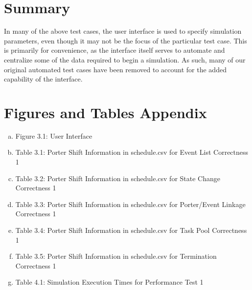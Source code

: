 \documentclass[paper=letter, fontsize=10pt]{scrartcl}
\numberwithin{equation}{section}		%
\numberwithin{figure}{section}			%
\numberwithin{table}{section}				%
\begin{document}
\section{Summary}
In many of the above test cases, the user interface is used to specify simulation parameters, even though it may not be the focus of the particular test case. This is primarily for convenience, as the interface itself serves to automate and centralize some of the data required to begin a simulation. As such, many of our original automated test cases have been removed to account for the added capability of the interface.
\section{Figures and Tables Appendix}
\begin{enumerate}[(a)]
	\item Figure 3.1: User Interface
	\item Table  3.1: Porter Shift Information in schedule.csv for Event List Correctness 1
	\item Table  3.2: Porter Shift Information in schedule.csv for State Change Correctness 1
	\item Table  3.3: Porter Shift Information in schedule.csv for Porter/Event Linkage Correctness 1
	\item Table  3.4: Porter Shift Information in schedule.csv for Task Pool Correctness 1
	\item Table  3.5: Porter Shift Information in schedule.csv for Termination Correctness 1
	\item Table  4.1: Simulation Execution Times for Performance Test 1
\end{enumerate}

\end{document}
